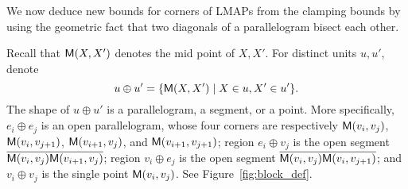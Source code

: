 \documentclass{ws-ijcga}
\begin{document}
We now deduce new bounds for corners of LMAPs from the clamping bounds
  by using the geometric fact that two diagonals of a parallelogram bisect each other.

\begin{definition}
Recall that $\mathsf{M}(X,X')$ denotes the mid point of $X,X'$.
For distinct units $u,u'$, denote
\begin{equation}\label{def:midregion}
u\oplus u'=\{\mathsf{M}(X,X')\mid X\in u, X'\in u'\}.
\end{equation}
The shape of $u\oplus u'$ is a parallelogram, a segment, or a point.
More specifically, $e_i\oplus e_j$ is an open parallelogram, whose four corners are respectively $\mathsf{M}(v_i,v_j)$, $\mathsf{M}(v_i,v_{j+1})$, $\mathsf{M}(v_{i+1},v_j)$, and $\mathsf{M}(v_{i+1},v_{j+1})$;
region $e_i\oplus v_j$ is the open segment $\overline{\mathsf{M}(v_i,v_j)\mathsf{M}(v_{i+1},v_j)}$;
region  $v_i\oplus e_j$ is the open segment $\overline{\mathsf{M}(v_i,v_j)\mathsf{M}(v_i,v_{j+1})}$;
and $v_i\oplus v_j$ is the single point $\mathsf{M}(v_i,v_j)$. See Figure~\ref{fig:block_def}.
\end{definition}
\end{document}
